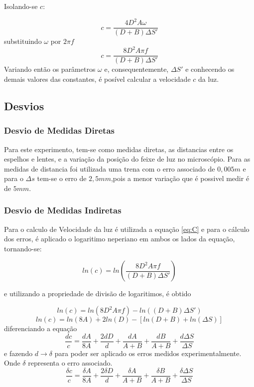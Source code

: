 Isolando-se $c$:

\begin{equation}
	c=\frac{4D^{2}A\omega}{(D+B)\Delta S'}
\end{equation}
substituindo $\omega$ por $2\pi f$
\begin{equation}
	c=\frac{8D^{2}A\pi f}{(D+B)\Delta S'}
\label{eq:C}
\end{equation}
Variando então os parâmetros $\omega$ e, consequentemente, $\Delta S'$ e conhecendo os demais valores das constantes, é posível calcular a velocidade $c$ da luz.

\subsection{Desvios}
\subsubsection{Desvio de Medidas Diretas}
Para este experimento, tem-se como medidas diretas, as distancias entre os espelhos e lentes, e a variação da posição do feixe de luz no microscópio. Para as medidas de distancia foi utilizada uma trena com o erro associado de $0,005m$ e para o $\Delta s$ tem-se o erro de $2,5mm$,pois a menor variação que é possivel medir é de $5mm$.
\subsubsection{Desvio de Medidas Indiretas}
Para o calculo de Velocidade da luz é utilizada a equação \ref{eq:C} e para o cálculo dos erros, é aplicado o logaritimo neperiano em ambos os lados da equação, tornando-se:

\begin{equation}
	ln(c)=ln(\frac{8D^{2}A\pi f}{(D+B)\Delta S'})
\end{equation}

e utilizando a propriedade de divisão de logaritimos, é obtido

\begin{equation}
	ln(c)=ln(8D^{2}A\pi f)-ln((D+B)\Delta S')
\end{equation}
\begin{equation}
	ln(c)=ln(8A) + 2ln(D) - [ln(D+B)+ln(\Delta S)]
\end{equation}
diferenciando a equação
\begin{equation}
	\frac{dc}{c}=\frac{dA}{8A} + \frac{2dD}{d} + \frac{dA}{A+B} + \frac{dB}{A+B}+\frac{d\Delta S}{\Delta S}
\end{equation}
e fazendo $d\rightarrow \delta$ para poder ser aplicado os erros medidos experimentalmente. Onde $\delta$ representa o erro associado.
\begin{equation}
	\frac{\delta c}{c}=\frac{\delta A}{8A} + \frac{2\delta D}{d} + \frac{\delta A}{A+B} + \frac{\delta B}{A+B}+\frac{\delta \Delta S}{\Delta S}
\label{eq:err}
\end{equation}
